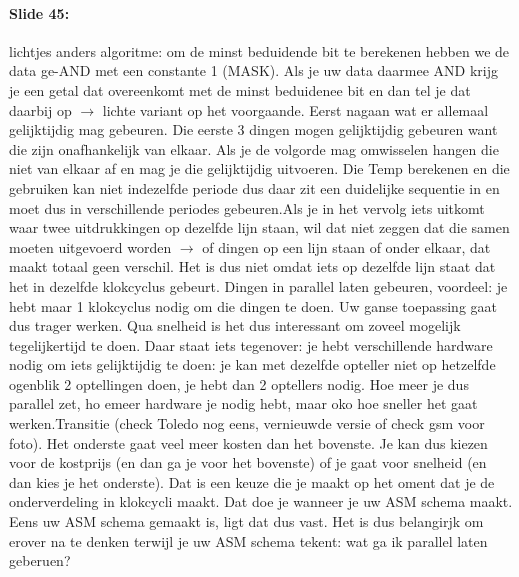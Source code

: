 \documentclass[10pt,a4paper]{book}
\begin{document}
\paragraph{Slide 45:} lichtjes anders algoritme: om de minst beduidende bit te berekenen hebben we de data ge-AND met een constante 1 (MASK). Als je uw data daarmee AND krijg je een getal dat overeenkomt met de minst beduidenee bit en dan tel je dat daarbij op $\rightarrow$ lichte variant op het voorgaande. Eerst nagaan wat er allemaal gelijktijdig mag gebeuren. Die eerste 3 dingen mogen gelijktijdig gebeuren want die zijn onafhankelijk van elkaar. Als je de volgorde mag omwisselen hangen die niet van elkaar af en mag je die gelijktijdig uitvoeren.  Die Temp berekenen en die gebruiken kan niet indezelfde periode dus daar zit een duidelijke sequentie in en moet dus in verschillende periodes gebeuren.Als je in het vervolg iets uitkomt waar twee uitdrukkingen op dezelfde lijn staan, wil dat niet zeggen dat die samen moeten uitgevoerd worden $\rightarrow$ of dingen op een lijn staan of onder elkaar, dat maakt totaal geen verschil. Het is dus niet omdat iets op dezelfde lijn staat dat het in dezelfde klokcyclus gebeurt. Dingen in parallel laten gebeuren, voordeel: je hebt maar 1 klokcyclus nodig om die dingen te doen. Uw ganse toepassing gaat dus trager werken. Qua snelheid is het dus interessant om zoveel mogelijk tegelijkertijd te doen. Daar staat iets tegenover: je hebt verschillende hardware nodig om iets gelijktijdig te doen: je kan met dezelfde opteller niet op hetzelfde ogenblik 2 optellingen doen, je hebt dan 2 optellers nodig. Hoe meer je dus parallel zet, ho emeer hardware je nodig hebt, maar oko hoe sneller het gaat werken.Transitie (check Toledo nog eens, vernieuwde versie of check gsm voor foto). Het onderste gaat veel meer kosten dan het bovenste. Je kan dus kiezen voor de kostprijs (en dan ga je voor het bovenste) of je gaat voor snelheid (en dan kies je het onderste). Dat is een keuze die je maakt op het oment dat je de onderverdeling in klokcycli maakt. Dat doe je wanneer je uw ASM schema maakt. Eens uw ASM schema gemaakt is, ligt dat dus vast. Het is dus belangirjk om erover na te denken terwijl je uw ASM schema tekent: wat ga ik parallel laten geberuen?
\end{document}

